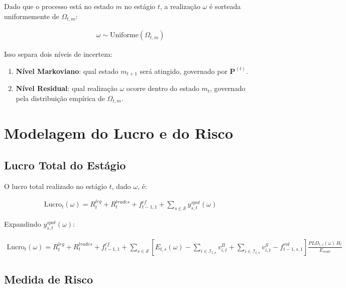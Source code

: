 \documentclass{article}
\begin{document}
Dado que o processo está no estado $m$ no estágio $t$, a realização $\omega$ é sorteada
uniformemente de $\Omega_{t,m}$:

\begin{align}
    \omega \sim \text{Uniforme}(\Omega_{t,m})
\end{align}

Isso separa dois níveis de incerteza:
\begin{enumerate}
    \item \textbf{Nível Markoviano}: qual estado $m_{t+1}$ será atingido, governado por $\mathbf{P}^{(t)}$.
    \item \textbf{Nível Residual}: qual realização $\omega$ ocorre dentro do estado $m_t$,
    governado pela distribuição empírica de $\Omega_{t,m}$.
\end{enumerate}

\section{Modelagem do Lucro e do Risco}

\subsection{Lucro Total do Estágio}

O lucro total realizado no estágio $t$, dado $\omega$, é:

\begin{align}
    \text{Lucro}_t(\omega) =
    R^{leg}_t + R^{trades}_t + f^{cf}_{t-1,1}
    + \sum_{s \in \mathcal{S}} y^{spot}_{s,t}(\omega)
\end{align}

Expandindo $y^{spot}_{s,t}(\omega)$:

\begin{align}
    \text{Lucro}_t(\omega) =
    R^{leg}_t + R^{trades}_t + f^{cf}_{t-1,1}
    + \sum_{s \in \mathcal{S}}
    \left[
        E_{t,s}(\omega)
        - \sum_{i \in \mathcal{I}_{t,s}} v^{B}_{i,t}
        + \sum_{i \in \mathcal{I}_{t,s}} v^{S}_{i,t}
        - f^{vol}_{t-1,s,1}
    \right]
    \frac{PLD_{t,s}(\omega)\, H_t}{E_{scale}}
\end{align}

\subsection{Medida de Risco}
\end{document}
